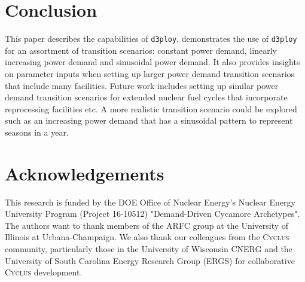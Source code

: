 \documentclass{anstrans}
\newcommand{\Cyclus}{\textsc{Cyclus}\xspace}%
\newcommand{\deploy}{\texttt{d3ploy}\xspace}%
\begin{document}
\section{Conclusion}
This paper describes the capabilities of \deploy, demonstrates 
the use of \deploy for an assortment of transition scenarios: 
constant power demand, linearly increasing power demand and
sinusoidal power demand.  
It also provides insights on parameter inputs when setting up larger
power demand transition scenarios that include many facilities. 
Future work includes setting up similar power demand transition 
scenarios for extended nuclear fuel cycles that incorporate reprocessing 
facilities etc. 
A more realistic transition scenario could be explored such as an 
increasing power demand that has a sinusoidal pattern to represent 
seasons in a year. 

\nopagebreak
\section{Acknowledgements}
This research is funded by the \gls{DOE} Office of 
Nuclear Energy's Nuclear Energy University Program (Project 16-10512) 
"Demand-Driven Cycamore Archetypes". The authors want to thank 
members of the \gls{ARFC} group at the University of Illinois at 
Urbana-Champaign. 
We also thank our colleagues from the \Cyclus community, 
particularly those in the University of Wisconsin 
\gls{CNERG} and the University of South Carolina Energy Research 
Group (ERGS) for collaborative \Cyclus development.



\end{document}
